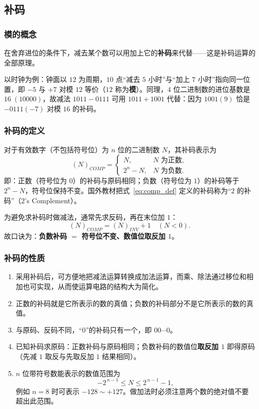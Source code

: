 \subsection{补码}
\subsubsection{模的概念}
在舍弃进位的条件下，减去某个数可以用加上它的\textbf{补码}来代替——这是补码运算的全部原理。

以时钟为例：钟面以 $12$ 为周期，$10$ 点``减去 $5$ 小时''与``加上 $7$ 小时''指向同一位置，即 $-5$ 与 $+7$ 对模 $12$ 等价（$12$ 称为\textbf{模}）。同理，$4$ 位二进制数的进位基数是 $16\;(10000)$，故减法 $1011-0111$ 可用 $1011+1001$ 代替：因为 $1001(9)$ 恰是 $-0111(-7)$ 对模 $16$ 的补码。

\subsubsection{补码的定义}
对于有效数字（不包括符号位）为 $n$ 位的二进制数 $N$，其补码表示为
\begin{equation}
\boxed{\;(N)_{COMP}=
\begin{cases}
N, & N \text{ 为正数},\\[2pt]
2^{n}-N, & N \text{ 为负数}.
\end{cases}\;}
\label{eq:comp_def}
\end{equation}
即：正数（符号位为 $0$）的补码与原码相同；负数（符号位为 $1$）的补码等于 $2^{n}-N$，符号位保持不变。国外教材把式~\eqref{eq:comp_def} 定义的补码称为``$2$ 的补码''（$2$'s Complement）。

为避免求补码时做减法，通常先求反码，再在末位加 $1$：
\begin{equation}
(N)_{COMP}=(N)_{INV}+1\quad (N<0).
\label{eq:comp_from_inv}
\end{equation}
故口诀为：\textbf{负数补码 $=$ 符号位不变、数值位取反加 $1$}。

\subsubsection{补码的性质}
\begin{enumerate}
    \item 采用补码后，可方便地把减法运算转换成加法运算，而乘、除法通过移位和相加也可实现，从而使运算电路的结构大为简化。
    \item 正数的补码就是它所表示的数的真值；负数的补码部分不是它所表示的数的真值。
    \item 与原码、反码不同，``$0$''的补码只有一个，即 $00\cdots0$。
    \item 已知补码求原码：正数补码与原码相同；负数补码的数值位\textbf{取反加 $1$} 即得原码（先减 $1$ 取反与先取反加 $1$ 结果相同）。
    \item $n$ 位带符号数能表示的数值范围为
    \begin{equation}
    -2^{\,n-1}\le N\le 2^{\,n-1}-1 ,
    \label{eq:range}
    \end{equation}
    例如 $n=8$ 时可表示 $-128\sim+127$。做加法时必须注意两个数的绝对值不要超出此范围。
\end{enumerate}


